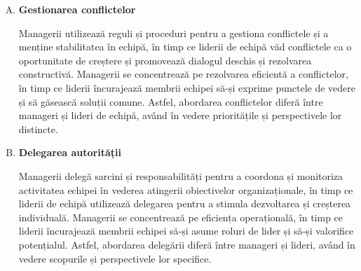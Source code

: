 \documentclass[a4paper, 12pt]{article}
\begin{document}
\begin{enumerate}[A)]
		\item \textbf{Gestionarea conflictelor}

		\quad\quad Managerii utilizează reguli și proceduri pentru a gestiona conflictele și a menține stabilitatea în echipă, în timp ce liderii de echipă văd conflictele ca o oportunitate de creștere și promovează dialogul deschis și rezolvarea constructivă. Managerii se concentrează pe rezolvarea eficientă a conflictelor, în timp ce liderii încurajează membrii echipei să-și exprime punctele de vedere și să găsească soluții comune. Astfel, abordarea conflictelor diferă între manageri și lideri de echipă, având în vedere prioritățile și perspectivele lor distincte.

		\item \textbf{Delegarea autorității}

		\quad\quad Managerii delegă sarcini și responsabilități pentru a coordona și monitoriza activitatea echipei în vederea atingerii obiectivelor organizaționale, în timp ce liderii de echipă utilizează delegarea pentru a stimula dezvoltarea și creșterea individuală. Managerii se concentrează pe eficiența operațională, în timp ce liderii încurajează membrii echipei să-și asume roluri de lider și să-și valorifice potențialul. Astfel, abordarea delegării diferă între manageri și lideri, având în vedere scopurile și perspectivele lor specifice.

	\end{enumerate}
\end{document}
